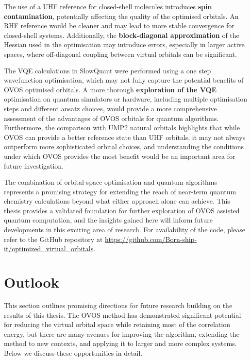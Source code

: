 The use of a UHF reference for closed-shell molecules introduces \textbf{spin contamination}, potentially affecting the quality of the optimised orbitals. An RHF reference would be cleaner and may lead to more stable convergence for closed-shell systems. Additionally, the \textbf{block-diagonal approximation} of the Hessian used in the optimisation may introduce errors, especially in larger active spaces, where off-diagonal coupling between virtual orbitals can be significant.  

The VQE calculations in SlowQuant were performed using a one step wavefunction optimisation, which may not fully capture the potential benefits of OVOS optimised orbitals. A more thorough \textbf{exploration of the VQE} optimisation on quantum simulators or hardware, including multiple optimisation steps and different ansatz choices, would provide a more comprehensive assessment of the advantages of OVOS orbitals for quantum algorithms. Furthermore, the comparison with UMP2 natural orbitals highlights that while OVOS can provide a better reference state than UHF orbitals, it may not always outperform more sophisticated orbital choices, and understanding the conditions under which OVOS provides the most benefit would be an important area for future investigation.

The combination of orbital-space optimisation and quantum algorithms represents a promising strategy for extending the reach of near-term quantum chemistry calculations beyond what either approach alone can achieve. This thesis provides a validated foundation for further exploration of OVOS assisted quantum computation, and the insights gained here will inform future developments in this exciting area of research. For availability of the code, please refer to the GitHub repository at \url{https://github.com/Born-ship-it/optimized_virtual_orbitals}.


\section{Outlook}
\label{sec:con_out_outlook}

This section outlines promising directions for future research building on the results of this thesis. The OVOS method has demonstrated significant potential for reducing the virtual orbital space while retaining most of the correlation energy, but there are many avenues for improving the algorithm, extending the method to new contexts, and applying it to larger and more complex systems. Below we discuss these opportunities in detail.


